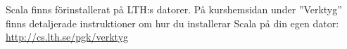 Scala finns förinstallerat på LTH:s datorer. På kurshemsidan under ''Verktyg'' finns detaljerade instruktioner om hur du installerar Scala på din egen dator:  \\ \url{http://cs.lth.se/pgk/verktyg}

%
%
%
%


